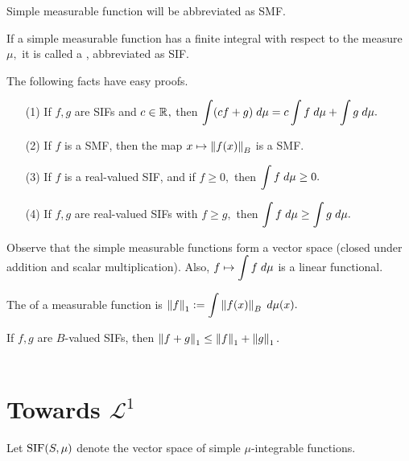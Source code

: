 \noindent Simple measurable function will be abbreviated as SMF.
\begin{defn}
If a simple measurable function has a finite integral with respect to the measure $\mu,$ it is called a , abbreviated as SIF.
\end{defn}
\noindent The following facts have easy proofs.

\begin{prop}
\begin{enumerate}
\item[(1)] If $f,g$ are SIFs and $c\in\mathbb{R}^{},$ then $\displaystyle\int(cf+g)\;d\mu=c\displaystyle\int f\;d\mu+\displaystyle\int g\;d\mu.$
\item[(2)] If $f$ is a SMF, then the map $x\mapsto\left\lVert f(x)\right\rVert_B$ is a SMF.
\item[(3)] If $f$ is a real-valued SIF, and if $f\geq 0,$ then $\displaystyle\int f\;d\mu\geq 0.$
\item[(4)] If $f,g$ are real-valued SIFs with $f\geq g,$ then $\displaystyle\int f\;d\mu\geq\displaystyle\int g\;d\mu.$
\end{enumerate}
\end{prop}

\noindent Observe that the simple measurable functions form a vector space (closed under addition and scalar multiplication). Also, $f\mapsto\displaystyle\int f\;d\mu$ is a linear functional.

\begin{defn}
The  of a measurable function is $\left\lVert f\right\rVert_1:=\displaystyle\int\left\lVert f(x)\right\rVert_B\;d\mu(x).$
\end{defn}

\begin{prop}
If $f,g$ are $B$-valued SIFs, then $\left\lVert f+g\right\rVert_1\leq\left\lVert f\right\rVert_1+\left\lVert g\right\rVert_1.$ \\ \\
\end{prop}

\section{Towards $\mathcal{L}^1$}

\noindent Let $\text{SIF}(S,\mu)$ denote the vector space of simple $\mu$-integrable functions.

